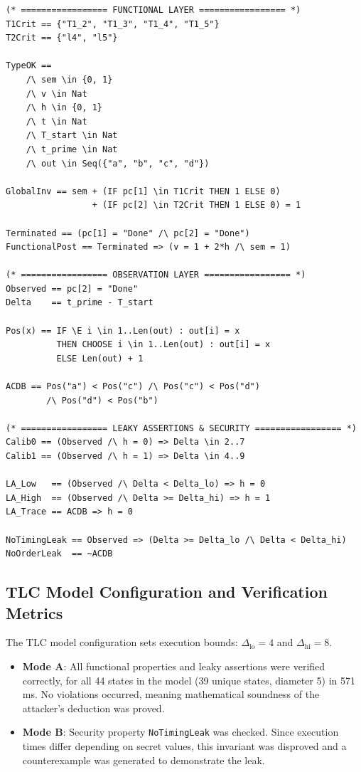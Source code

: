 \documentclass[a4paper,12pt]{report}
\begin{document}
\clearpage
\begin{lstlisting}[style=pluscalstyle, caption={TLA+ layered invariants and leaky assertions for ConcurrentLeak.}, label={lst:concurrent-invariants}]
(* ================= FUNCTIONAL LAYER ================= *)
T1Crit == {"T1_2", "T1_3", "T1_4", "T1_5"}
T2Crit == {"l4", "l5"}

TypeOK ==
    /\ sem \in {0, 1}
    /\ v \in Nat
    /\ h \in {0, 1}
    /\ t \in Nat
    /\ T_start \in Nat
    /\ t_prime \in Nat
    /\ out \in Seq({"a", "b", "c", "d"})

GlobalInv == sem + (IF pc[1] \in T1Crit THEN 1 ELSE 0)
                 + (IF pc[2] \in T2Crit THEN 1 ELSE 0) = 1

Terminated == (pc[1] = "Done" /\ pc[2] = "Done")
FunctionalPost == Terminated => (v = 1 + 2*h /\ sem = 1)

(* ================= OBSERVATION LAYER ================= *)
Observed == pc[2] = "Done"
Delta    == t_prime - T_start

Pos(x) == IF \E i \in 1..Len(out) : out[i] = x 
          THEN CHOOSE i \in 1..Len(out) : out[i] = x 
          ELSE Len(out) + 1

ACDB == Pos("a") < Pos("c") /\ Pos("c") < Pos("d") 
        /\ Pos("d") < Pos("b")

(* ================= LEAKY ASSERTIONS & SECURITY ================= *)
Calib0 == (Observed /\ h = 0) => Delta \in 2..7
Calib1 == (Observed /\ h = 1) => Delta \in 4..9

LA_Low   == (Observed /\ Delta < Delta_lo) => h = 0
LA_High  == (Observed /\ Delta >= Delta_hi) => h = 1
LA_Trace == ACDB => h = 0

NoTimingLeak == Observed => (Delta >= Delta_lo /\ Delta < Delta_hi)
NoOrderLeak  == ~ACDB
\end{lstlisting}
\clearpage

\subsection{TLC Model Configuration and Verification Metrics}
The TLC model configuration sets execution bounds: $\Delta_{\text{lo}} = 4$ and $\Delta_{\text{hi}} = 8$.
\begin{itemize}[itemsep=0.15em, topsep=0.12em]
    \item \textbf{Mode A}: All functional properties and leaky assertions were verified correctly, for all 44 states in the model (39 unique states, diameter 5) in 571\,ms. No violations occurred, meaning mathematical soundness of the attacker's deduction was proved.
    \item \textbf{Mode B}: Security property \texttt{NoTimingLeak} was checked. Since execution times differ depending on secret values, this invariant was disproved and a counterexample was generated to demonstrate the leak.
\end{itemize}
\end{document}

